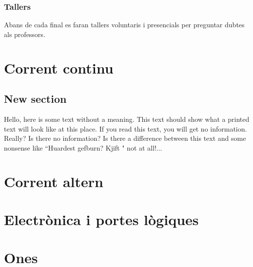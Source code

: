 \documentclass[12pt, a4paper, twoside]{report}
\begin{document}
\subsection*{Tallers}
Abans de cada final es faran tallers voluntaris i presencials per preguntar dubtes als professors. 

\chapter{Corrent continu}
\section{New section}

Hello, here is some text without a meaning.  This text should 
show what a printed text will look like at this place.  If you 
read this text, you will get no information.  Really?  Is there 
no information?  Is there a difference between this text and some 
nonsense like ``Huardest gefburn?  Kjift " not at all!...

\chapter{Corrent altern}
\chapter{Electrònica i portes lògiques}
\chapter{Ones}
\end{document}

